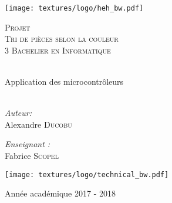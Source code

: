 \begin{center}
  \texttt{[image: textures/logo/heh\_bw.pdf]}

  \vspace{1cm}

  \textsc{\LARGE Projet} \\ [0.5cm]
  \textsc{\Large Tri de pièces selon la couleur} \\ [0.5cm]

  \textsc{\large 3 Bachelier en Informatique} \\ [0.2cm]

  \begingroup
   \selectfont 

  \HRule \\ [0.4cm] {
    \huge Application des microcontrôleurs \\ [0.2cm] 
  }
  \HRule \\ [1.3cm]
  \endgroup
  \begin{minipage}[t]{0.4 \textwidth} 
    \begin{flushleft} 
      \large \emph{Auteur:} \\ 
      Alexandre \textsc{Ducobu}
    \end{flushleft} 
  \end{minipage}
  \begin{minipage}[t]{0.4 \textwidth}
    \begin{flushright} 
      \large \emph{Enseignant :} \\
      Fabrice \textsc{Scopel}
    \end{flushright} 
  \end{minipage}

  \vspace{1cm}

  \texttt{[image: textures/logo/technical\_bw.pdf]}

  \vspace{0.5cm}

  Année académique 2017 - 2018
\end{center}

\thispagestyle{empty}

